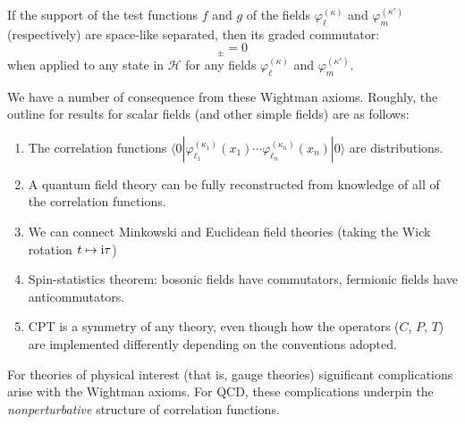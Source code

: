 \begin{axiom}[Microcausality]
If the support of the test functions $f$ and $g$ of the fields
$\varphi^{(\kappa)}_{\ell}$ and $\varphi^{(\kappa')}_{m}$ (respectively)
are space-like separated, then its graded commutator:
\begin{equation}
[\varphi^{(\kappa)}_{\ell}(f), \varphi^{(\kappa')}_{m}(g)]_{\pm} = 0
\end{equation}
when applied to any state in $\mathcal{H}$ for any fields
$\varphi^{(\kappa)}_{\ell}$ and $\varphi^{(\kappa')}_{m}$.
\end{axiom}

We have a number of consequence from these Wightman axioms. Roughly, the
outline for results for scalar fields (and other simple fields) are as
follows:
\begin{enumerate}
\item The correlation functions $\langle0|\varphi^{(\kappa_{1})}_{\ell_{1}}(x_{1}) \cdots\varphi^{(\kappa_{n})}_{\ell_{n}}(x_{n})|0\rangle$
are distributions.
\item A quantum field theory can be fully reconstructed from knowledge
  of all of the correlation functions.
\item We can connect Minkowski and Euclidean field theories (taking the
  Wick rotation $t\mapsto\mathrm{i}\tau$)
\item Spin-statistics theorem: bosonic fields have commutators,
  fermionic fields have anticommutators.
\item CPT is a symmetry of any theory, even though how the operators
  ($C$, $P$, $T$) are implemented differently depending on the
  conventions adopted.
\end{enumerate}

\label{chunk:outline:pseudo-wightman-axioms}
For theories of physical interest (that is, gauge theories) significant
complications arise with the Wightman axioms. For QCD, these
complications underpin the \emph{nonperturbative} structure of
correlation functions.

